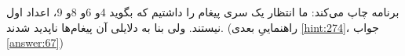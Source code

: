 \section{}
\paragraph{}\label{hint:354}
برنامه چاپ می‌کند:
\LTR\noindent
{}
\RTL
ما انتظار یک سری پیغام را داشتیم که بگوید 4و 6و 8و 9، اعداد اول نیستند. ولی بنا به دلایلی آن پیغام‌ها ناپدید شدند. (راهنماییِ بعدی \ref{hint:274}، جواب \ref{answer:67})